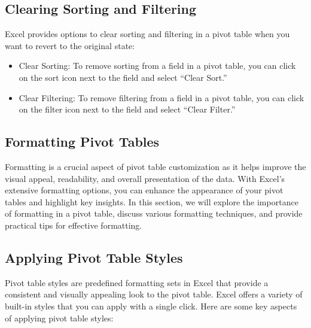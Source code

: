 \documentclass[
]{book}
\begin{document}
\hypertarget{clearing-sorting-and-filtering}{%
\subsection{Clearing Sorting and Filtering}\label{clearing-sorting-and-filtering}}

Excel provides options to clear sorting and filtering in a pivot table when you want to revert to the original state:

\begin{itemize}
\item
  Clear Sorting: To remove sorting from a field in a pivot table, you can click on the sort icon next to the field and select ``Clear Sort.''
\item
  Clear Filtering: To remove filtering from a field in a pivot table, you can click on the filter icon next to the field and select ``Clear Filter.''
\end{itemize}

\hypertarget{formatting-pivot-tables}{%
\subsection{Formatting Pivot Tables}\label{formatting-pivot-tables}}

Formatting is a crucial aspect of pivot table customization as it helps improve the visual appeal, readability, and overall presentation of the data. With Excel's extensive formatting options, you can enhance the appearance of your pivot tables and highlight key insights. In this section, we will explore the importance of formatting in a pivot table, discuss various formatting techniques, and provide practical tips for effective formatting.

\hypertarget{applying-pivot-table-styles}{%
\subsection{Applying Pivot Table Styles}\label{applying-pivot-table-styles}}

Pivot table styles are predefined formatting sets in Excel that provide a consistent and visually appealing look to the pivot table. Excel offers a variety of built-in styles that you can apply with a single click. Here are some key aspects of applying pivot table styles:
\end{document}
